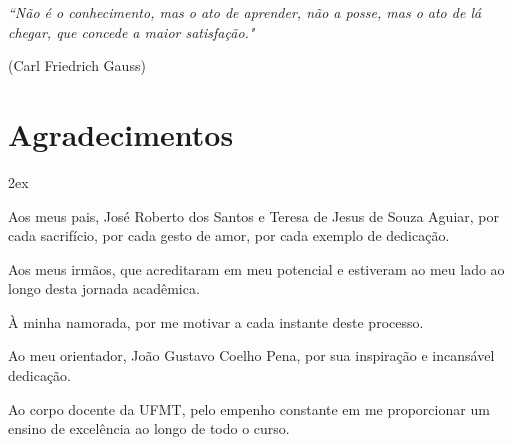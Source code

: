 \begin{titlepage}

\vspace*{\fill}

\hfill
\begin{minipage}{0.5\linewidth}
\begin{flushright}
\large\it
``Não é o conhecimento, 
mas o ato de aprender, 
não a posse, 
mas o ato de lá chegar, 
que concede a maior satisfação."

(Carl Friedrich Gauss)
\end{flushright}
\end{minipage}

\vspace*{\fill}

\end{titlepage}

\chapter*{Agradecimentos}
\thispagestyle{empty}

\begin{trivlist}  \itemsep 2ex

\item Aos meus pais, José Roberto dos Santos e Teresa de Jesus de Souza Aguiar, por cada sacrifício, por cada gesto de amor, por cada exemplo de dedicação. 

\item Aos meus irmãos, que acreditaram em meu potencial e estiveram ao meu lado ao longo desta jornada acadêmica.

\item À minha namorada, por me motivar a cada instante deste processo.

\item Ao meu orientador, João Gustavo Coelho Pena, por sua inspiração e incansável dedicação.

\item Ao corpo docente da UFMT, pelo empenho constante em me proporcionar um ensino de excelência ao longo de todo o curso.

\end{trivlist}
